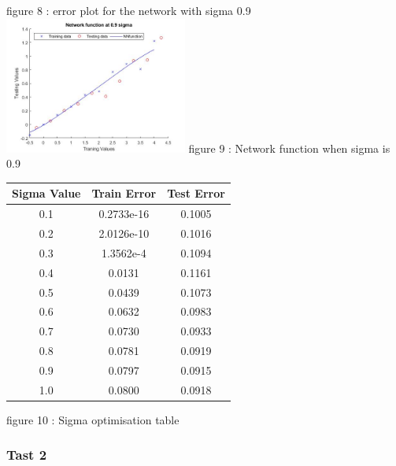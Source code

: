 \documentclass{IEEEtran}[11pt]
\begin{document}
\begin{flushleft}
  \vspace{1.5mm}
  {\footnotesize figure 8 : error plot for the network with sigma 0.9 }
  \\
  \vspace{1.5mm}
  \includegraphics[width = 0.45\textwidth]{NNfunctiontask1.jpg}
  \vspace{1.5mm}
  {\footnotesize figure 9 : Network function when sigma is 0.9 }
  \\
  \vspace{1.5mm}
\end{flushleft}
\begin{center}
  \begin{tabular}{||c c c||}
    \hline
    Sigma Value & Train Error & Test Error \\ [0.5ex]
    \hline
    0.1 & 0.2733e-16 & 0.1005\\
    0.2 & 2.0126e-10 & 0.1016\\
    0.3 & 1.3562e-4 & 0.1094\\
    0.4 & 0.0131 & 0.1161 \\
    0.5 & 0.0439 & 0.1073 \\
    0.6 & 0.0632 & 0.0983\\
    0.7 & 0.0730 & 0.0933\\
    0.8 & 0.0781 & 0.0919\\
    0.9 & 0.0797 & 0.0915\\
    1.0 & 0.0800 & 0.0918\\
    \hline
  \end{tabular}
\end{center}
\vspace{1.5mm}
{\footnotesize figure 10 : Sigma optimisation table }
\\
\vspace{1.5mm}
\subsubsection{Tast 2}
\end{document}
